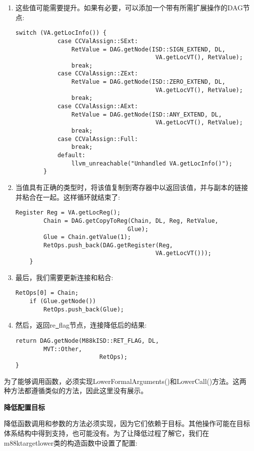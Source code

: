 \begin{enumerate}
\item 这些值可能需要提升。如果有必要，可以添加一个带有所需扩展操作的DAG节点:
\begin{lstlisting}[caption={}]
		switch (VA.getLocInfo()) {
			case CCValAssign::SExt:
				RetValue = DAG.getNode(ISD::SIGN_EXTEND, DL,
										VA.getLocVT(), RetValue);
				break;
			case CCValAssign::ZExt:
				RetValue = DAG.getNode(ISD::ZERO_EXTEND, DL,
										VA.getLocVT(), RetValue);
				break;
			case CCValAssign::AExt:
				RetValue = DAG.getNode(ISD::ANY_EXTEND, DL,
										VA.getLocVT(), RetValue);
				break;
			case CCValAssign::Full:
				break;
			default:
				llvm_unreachable("Unhandled VA.getLocInfo()");
		}
\end{lstlisting}

\item 当值具有正确的类型时，将该值复制到寄存器中以返回该值，并与副本的链接并粘合在一起。这样循环就结束了:
\begin{lstlisting}[caption={}]
		Register Reg = VA.getLocReg();
		Chain = DAG.getCopyToReg(Chain, DL, Reg, RetValue,
								Glue);
		Glue = Chain.getValue(1);
		RetOps.push_back(DAG.getRegister(Reg,
										VA.getLocVT()));
	}
\end{lstlisting}

\item 最后，我们需要更新连接和粘合:
\begin{lstlisting}[caption={}]
	RetOps[0] = Chain;
	if (Glue.getNode())
		RetOps.push_back(Glue);
\end{lstlisting}
	
\item 然后，返回re\underline{~}flag节点，连接降低后的结果:
\begin{lstlisting}[caption={}]
	return DAG.getNode(M88kISD::RET_FLAG, DL,
		MVT::Other,
						RetOps);
}
\end{lstlisting}
	
\end{enumerate}

为了能够调用函数，必须实现LowerFormalArguments()和LowerCall()方法。这两种方法都遵循类似的方法，因此这里没有展示。\par

\hspace*{\fill} \par %
\textbf{降低配置目标}

降低函数调用和参数的方法必须实现，因为它们依赖于目标。其他操作可能在目标体系结构中得到支持，也可能没有。为了让降低过程了解它，我们在m88ktargetlower类的构造函数中设置了配置:\par

